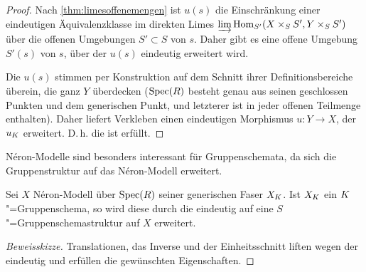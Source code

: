 \documentclass[german]{scrreprt}
\begin{document}
\begin{Satz}
\begin{proof}
    Nach \autoref{thm:limesoffenemengen} ist $u(s)$ die Einschränkung
    einer eindeutigen Äquivalenzklasse im direkten Limes
    $\varinjlim \operatorname{Hom}_{S'}(X\times_S S', Y\times_S S')$ über die
    offenen Umgebungen $S'\subset S$ von $s$.
    Daher gibt es eine offene Umgebung $S'(s)$ von $s$, über der $u(s)$
    eindeutig erweitert wird.
    
    Die $u(s)$ stimmen per Konstruktion auf dem Schnitt ihrer
    Definitionsbereiche überein,
    die ganz $Y$ überdecken ($\operatorname{Spec}(R)$ besteht genau aus seinen
    geschlossen Punkten und dem generischen Punkt, und letzterer ist
    in jeder offenen Teilmenge enthalten).
    Daher liefert Verkleben einen eindeutigen Morphismus
    $u\colon Y\to X$, der $u_{K}$ erweitert.
    D.\,h. die \NAbbEig ist erfüllt.
  \end{proof}
\end{Satz}


Néron-Modelle sind besonders interessant für Gruppenschemata, da sich
die Gruppenstruktur auf das Néron-Modell erweitert.

\begin{Bemerkung}\label{thm:gruppenschemaerweiterung}
  \cite[1.2, Proposition 6]{neron}
  Sei $X$ Néron-Modell über $\operatorname{Spec}(R)$ seiner generischen Faser
  $X_{K}$. Ist $X_{K}$ ein $K$"=Gruppenschema, so wird diese durch die
  \NAbbEig eindeutig auf eine
  $S$"=Gruppenschemastruktur auf $X$ erweitert.
  \begin{proof}[Beweisskizze]
    Translationen, das Inverse und der Einheitsschnitt liften wegen
    der \NAbbEig eindeutig und erfüllen die gewünschten Eigenschaften.
  \end{proof}
\end{Bemerkung}
\end{document}
